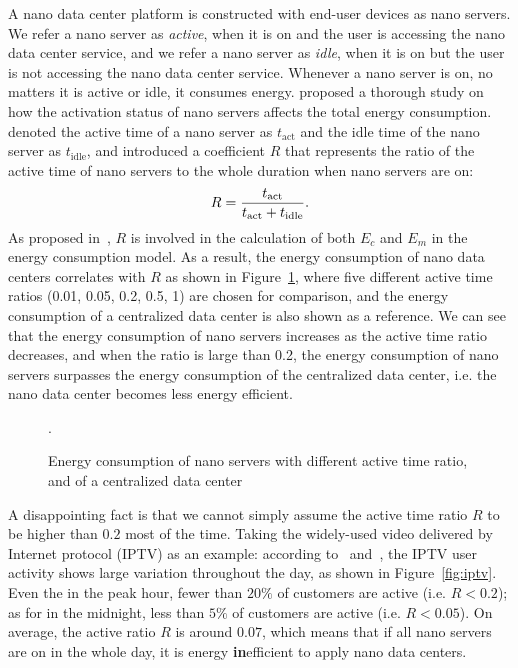 A nano data center platform is constructed with end-user devices as nano servers.
We refer a nano server as \textit{active}, when it is on and the user is accessing the nano data center service,
and we refer a nano server as \textit{idle}, when it is on but the user is not accessing the nano data center service.
Whenever a nano server is on,
no matters it is active or idle,
it consumes energy.
\cite{DBLP:conf/conext/ValanciusLMDR09} proposed a thorough study on how the activation status of nano servers affects the total energy consumption.
\cite{DBLP:conf/conext/ValanciusLMDR09} denoted the active time of a nano server as $t_\text{act}$ and the idle time of the nano server as $t_\text{idle}$,
and introduced a coefficient $R$ that represents the ratio of the active time of nano servers to the whole duration when nano servers are on:
\begin{equation}
R=\frac{t_\text{act}}{t_\text{act}+t_\text{idle}}.\\
\end{equation}
As proposed in~\cite{DBLP:conf/conext/ValanciusLMDR09}, 
$R$ is involved in the calculation of both $E_c$ and $E_m$ in the energy consumption model.
As a result,
the energy consumption of nano data centers correlates with $R$ as shown in Figure~\ref{fig:active},
where five different active time ratios (0.01, 0.05, 0.2, 0.5, 1) are chosen for comparison,	
and the energy consumption of a centralized data center is also shown as a reference.
We can see that the energy consumption of nano servers increases as the active time ratio decreases,
and when the ratio is large than 0.2, the energy consumption of nano servers surpasses the energy consumption of the centralized data center,
i.e. the nano data center becomes less energy efficient.

\begin{figure}[h]
	\fontsize{12}{12} \selectfont
	\centerline{\resizebox{5cm}{!}{}}
	\caption{Energy consumption of nano servers with different active time ratio, and of a centralized data center~\cite{DBLP:conf/conext/ValanciusLMDR09}}.
	\label{fig:active}
	\normalsize
\end{figure}

A disappointing fact is that we cannot simply assume the active time ratio $R$ to be higher than $0.2$ most of the time.
Taking the widely-used video delivered by Internet protocol (IPTV)  as an example:
according to~\cite{DBLP:conf/conext/ValanciusLMDR09} and~\cite{watchingTV},
the IPTV user activity shows large variation throughout the day,
as shown in Figure~\ref{fig:iptv}.
Even the in the peak hour,
fewer than $20\%$ of customers are active (i.e. $R<0.2$);
as for in the midnight,
less than $5\%$ of customers are active (i.e. $R<0.05$).
On average,
the active ratio $R$ is around $0.07$,
which means that if all nano servers are on in the whole day,
it is energy \textbf{in}efficient to apply nano data centers.

